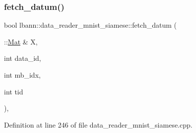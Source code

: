 \subsubsection{\texorpdfstring{fetch\+\_\+datum()}{fetch\_datum()}\hspace{0.1cm}{\footnotesize\ttfamily [1/2]}}
{\footnotesize\ttfamily bool lbann\+::data\+\_\+reader\+\_\+mnist\+\_\+siamese\+::fetch\+\_\+datum (\begin{DoxyParamCaption}\item[{\+::\hyperlink{base_8hpp_a68f11fdc31b62516cb310831bbe54d73}{Mat} \&}]{X,  }\item[{int}]{data\+\_\+id,  }\item[{int}]{mb\+\_\+idx,  }\item[{int}]{tid }\end{DoxyParamCaption})\hspace{0.3cm}{\ttfamily [override]}, {\ttfamily [protected]}}



Definition at line 246 of file data\+\_\+reader\+\_\+mnist\+\_\+siamese.\+cpp.


